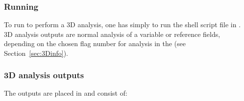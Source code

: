 \subsubsection{Running }

To run \diva to perform a 3D analysis, one has simply to run the shell script file  in . \diva 3D analysis outputs are normal analysis of a variable or reference fields, depending on the chosen flag number for analysis in the  (see Section~\ref{sec:3Dinfo}).


\subsubsection{\diva 3D analysis outputs}

The outputs are placed in  and consist of:

